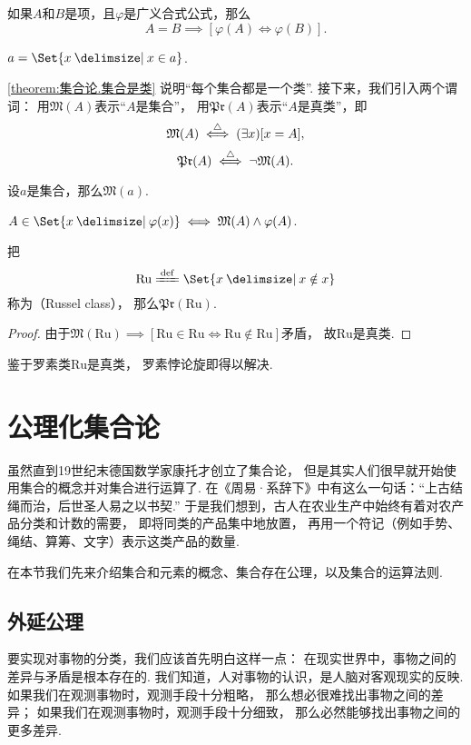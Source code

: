 \begin{theorem}
如果\(A\)和\(B\)是项，且\(\varphi\)是广义合式公式，那么\[
	A=B \implies [\varphi(A)\iff\varphi(B)].
\]
\end{theorem}

\begin{theorem}\label{theorem:集合论.集合是类}
\(a=\Set{ x \given x \in a }\).
\end{theorem}
\cref{theorem:集合论.集合是类} 说明“每个集合都是一个类”.
接下来，我们引入两个谓词：
用\(\mathfrak{M}(A)\)表示“\(A\)是集合”，
用\(\mathfrak{Pr}(A)\)表示“\(A\)是真类”，即\[
	\mathfrak{M}(A) \overset{\triangle}{\iff} (\exists x)[x = A],
\]\[
	\mathfrak{Pr}(A) \overset{\triangle}{\iff} \neg\mathfrak{M}(A).
\]

\begin{theorem}
设\(a\)是集合，那么\(\mathfrak{M}(a)\).
\end{theorem}

\begin{theorem}
\(A \in \Set{ x \given \varphi(x) } \iff \mathfrak{M}(A) \land \varphi(A)\).
\end{theorem}

\begin{theorem}
\def\Ru{\mathrm{Ru}}
把\[
	\Ru \defeq \Set{ x \given x \notin x }
\]称为{\rm{}（Russel class）}，
那么\(\mathfrak{Pr}(\Ru)\).
\begin{proof}
由于\(\mathfrak{M}(\Ru)
\implies
[\Ru\in\Ru\iff\Ru\notin\Ru]\)矛盾，
故\(\Ru\)是真类.
\end{proof}
\end{theorem}
鉴于罗素类\(\mathrm{Ru}\)是真类，
罗素悖论旋即得以解决.



\section{公理化集合论}
虽然直到19世纪末德国数学家康托才创立了集合论，
但是其实人们很早就开始使用集合的概念并对集合进行运算了.
在《周易·系辞下》中有这么一句话：“上古结绳而治，后世圣人易之以书契.”
于是我们想到，古人在农业生产中始终有着对农产品分类和计数的需要，
即将同类的产品集中地放置，
再用一个符记（例如手势、绳结、算筹、文字）表示这类产品的数量.

在本节我们先来介绍集合和元素的概念、集合存在公理，以及集合的运算法则.

\subsection{外延公理}
要实现对事物的分类，我们应该首先明白这样一点：
在现实世界中，事物之间的差异与矛盾是根本存在的.
我们知道，人对事物的认识，是人脑对客观现实的反映.
如果我们在观测事物时，观测手段十分粗略，
那么想必很难找出事物之间的差异；
如果我们在观测事物时，观测手段十分细致，
那么必然能够找出事物之间的更多差异.

